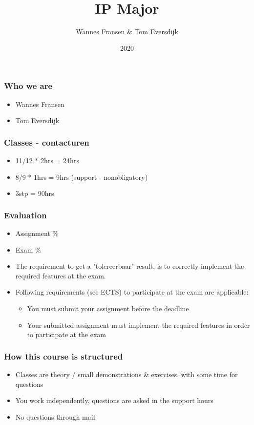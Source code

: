 \documentclass{beamer}
\title{IP Major}
\author{Wannes Fransen \& Tom Eversdijk}
\institute{UC Leuven}
\date{2020}
\begin{document}
\frame{\titlepage}


\begin{frame}
    \frametitle{Who we are}
    \begin{itemize}
        \item Wannes Fransen
        \item Tom Eversdijk
    \end{itemize}
\end{frame}


\begin{frame}
    \frametitle{Classes - contacturen}

    \begin{itemize}
        \item 11/12 * 2hrs = 24hrs
        \item 8/9 * 1hrs = 9hrs (support - nonobligatory)
        \item 3stp = 90hrs
    \end{itemize}

\end{frame}

\begin{frame}
    \frametitle{Evaluation}

    \begin{itemize}
        \item Assignment  \%
        \item Exam   \%
    \end{itemize}

    \vfill

    \begin{itemize}
        \small
        \item The requirement to get a "tolereerbaar" result,
         is to correctly implement the required features at the exam.
         \item Following requirements (see ECTS) to participate at the exam are applicable:
         \begin{itemize}
             \item You must submit your assignment before the deadline
             \item Your submitted assignment must implement the required features in order to participate at the exam
         \end{itemize}
    \end{itemize}
\end{frame}


\begin{frame}
    \frametitle{How this course is structured}

    \begin{itemize}
        \item Classes are theory / small demonstrations \& exercises, with some time for questions
        \item You work independently, questions are asked in the support hours
        \item No questions through mail
    \end{itemize}
\end{frame}
\end{document}
